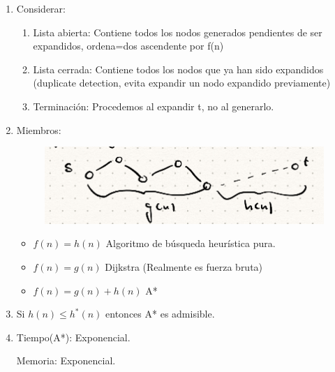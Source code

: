 \documentclass[12pt, twoside, openright]{report} %
\begin{document}
  \begin{enumerate}
  \item
    Considerar:

    \begin{enumerate}
  
    \item
      Lista abierta: Contiene todos los nodos generados pendientes de
      ser expandidos, ordena=dos ascendente por f(n)
    \item
      Lista cerrada: Contiene todos los nodos que ya han sido expandidos
      (duplicate detection, evita expandir un nodo expandido
      previamente)
    \item
      Terminación: Procedemos al expandir t, no al generarlo.
    \end{enumerate}
  \item
    Miembros:
	\begin{figure}[H]
		{\includegraphics[scale=.45]{Untitled 55.png}}
	\end{figure}
    \begin{itemize}
  
    \item
      \(f(n)=h(n)\) Algoritmo de búsqueda heurística pura.
    \item
      \(f(n)=g(n)\) Dijkstra (Realmente es fuerza bruta)
    \item
      \(f(n) = g(n) + h(n)\) A*
    \end{itemize}
  \item
    Si \(h(n) \leq h^*(n)\) entonces A* es admisible.
  \item
    Tiempo(A*): Exponencial.

    Memoria: Exponencial.


\end{enumerate}
\end{document}
